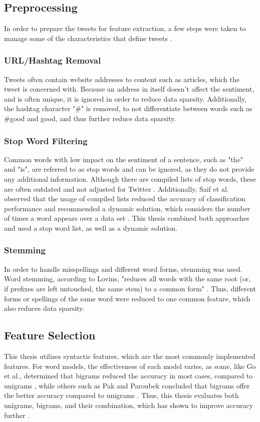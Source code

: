\subsection{Preprocessing}
In order to prepare the tweets for feature extraction, a few steps were taken to manage some of the characteristics that define tweets \cite{DBLP:journals/csur/GiachanouC16}.

\subsubsection{URL/Hashtag Removal}
Tweets often contain website addresses to content such as articles, which the tweet is concerned with. Because an address in itself doesn't affect the sentiment, and is often unique, it is ignored in order to reduce data sparsity. Additionally, the hashtag character "\#" is removed, to not differentiate between words such as \#good and good, and thus further reduce data sparsity.

\subsubsection{Stop Word Filtering}
Common words with low impact on the sentiment of a sentence, such as "the" and "is", are referred to as stop words and can be ignored, as they do not provide any additional information. Although there are compiled lists of stop words, these are often outdated and not adjusted for Twitter \cite{DBLP:journals/csur/GiachanouC16}. Additionally, Saif et al. observed that the usage of compiled lists reduced the accuracy of classification performance and recommended a dynamic solution, which considers the number of times a word appears over a data set \cite{data_sparsity}. This thesis combined both approaches and used a stop word list, as well as a dynamic solution.

\subsubsection{Stemming}
In order to handle misspellings and different word forms, stemming was used. Word stemming, according to Lovins, "reduces all words with the same root (or, if prefixes are left
untouched, the same stem) to a common form" \cite[p.~22]{Lovins1968DevelopmentOA}. Thus, different forms or spellings of the same word were reduced to one common feature, which also reduces data sparsity.

\subsection{Feature Selection}
This thesis utilizes syntactic features, which are the most commonly implemented features. For word models, the effectiveness of each model varies, as some, like Go et al., determined that bigrams reduced the accuracy in most cases, compared to unigrams \cite{GoBHaHua2009}, while others such as Pak and Paroubek concluded that bigrams offer the better accuracy compared to unigrams \cite{pak}. Thus, this thesis evaluates both unigrams, bigrams, and their combination, which has shown to improve accuracy further \cite{GoBHaHua2009}.

